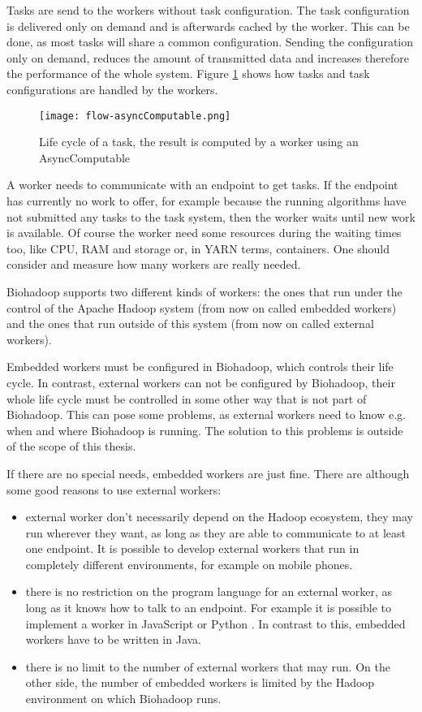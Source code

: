 Tasks are send to the workers without task configuration. The task configuration is delivered only on demand and is afterwards cached by the worker. This can be done, as most tasks will share a common configuration. Sending the configuration only on demand, reduces the amount of transmitted data and increases therefore the performance of the whole system. Figure \ref{fig:async-computable} shows how tasks and task configurations are handled by the workers.

\begin{figure}[ht!]
  \centering
  \texttt{[image: flow-asyncComputable.png]}
  \caption{Life cycle of a task, the result is computed by a worker using an AsyncComputable}
  \label{fig:async-computable}
\end{figure}

A worker needs to communicate with an endpoint to get tasks. If the endpoint has currently no work to offer, for example because the running algorithms have not submitted any tasks to the task system, then the worker waits until new work is available. Of course the worker need some resources during the waiting times too, like CPU, RAM and storage or, in YARN terms, containers. One should consider and measure how many workers are really needed.

Biohadoop supports two different kinds of workers: the ones that run under the control of the Apache Hadoop system (from now on called embedded workers) and the ones that run outside of this system (from now on called external workers).

Embedded workers must be configured in Biohadoop, which controls their life cycle. In contrast, external workers can not be configured by Biohadoop, their whole life cycle must be controlled in some other way that is not part of Biohadoop. This can pose some problems, as external workers need to know e.g. when and where Biohadoop is running. The solution to this problems is outside of the scope of this thesis.

If there are no special needs, embedded workers are just fine. There are although some good reasons to use external workers:

\begin{itemize}
  \item external worker don't necessarily depend on the Hadoop ecosystem, they may run wherever they want, as long as they are able to communicate to at least one endpoint. It is possible to develop external workers that run in completely different environments, for example on mobile phones.
  \item there is no restriction on the program language for an external worker, as long as it knows how to talk to an endpoint. For example it is possible to implement a worker in JavaScript \cite{bioworker-browser} or Python \cite{bioworker-python}. In contrast to this, embedded workers have to be written in Java.
  \item there is no limit to the number of external workers that may run. On the other side, the number of embedded workers is limited by the Hadoop environment on which Biohadoop runs.
\end{itemize}

